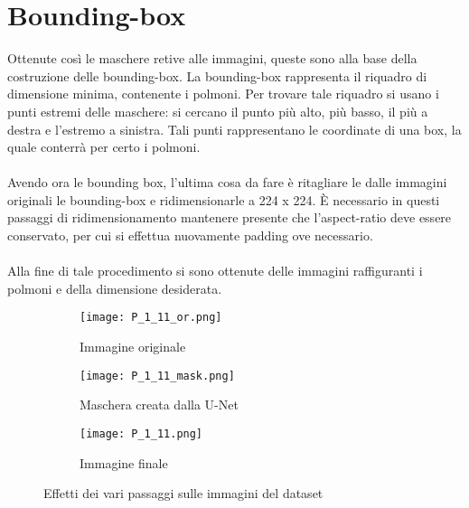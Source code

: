 \section{Bounding-box}
Ottenute così le maschere retive alle immagini, queste sono alla base della costruzione delle bounding-box.
La bounding-box rappresenta il riquadro di dimensione minima, contenente i polmoni.
Per trovare tale riquadro si usano i punti estremi delle maschere: si cercano il punto più alto, più basso, il più a destra e l'estremo a sinistra.
Tali punti rappresentano le coordinate di una box, la quale conterrà per certo i polmoni.
\\\\
Avendo ora le bounding box, l'ultima cosa da fare è ritagliare le dalle immagini originali le bounding-box e ridimensionarle a 224 x 224.
È necessario in questi passaggi di ridimensionamento mantenere presente che l'aspect-ratio deve essere conservato, per cui si effettua nuovamente padding ove necessario.
\\\\
Alla fine di tale procedimento si sono ottenute delle immagini raffiguranti i polmoni e della dimensione desiderata.
\begin{figure}[h]
    \centering
    \begin{subfigure}{.45\textwidth}
        \centering
        \texttt{[image: P\_1\_11\_or.png]}  
        \caption{Immagine originale}
    \end{subfigure}
    \begin{subfigure}{.45\textwidth}
        \centering
        \texttt{[image: P\_1\_11\_mask.png]}  
        \caption{Maschera creata dalla U-Net}
    \end{subfigure}
    \begin{subfigure}{.45\textwidth}
        \centering
        \texttt{[image: P\_1\_11.png]}  
        \caption{Immagine finale}
    \end{subfigure}
    \caption{Effetti dei vari passaggi sulle immagini del dataset}
    \label{Transformation}
\end{figure}

